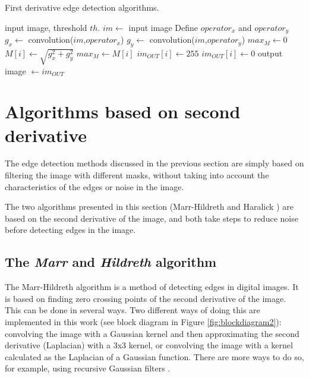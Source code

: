 \documentclass{ipol}
\numberwithin{equation}{section}
\numberwithin{table}{section}
\begin{document}
\begin{algorithm}[t]
\caption{First derivative edge detection algorithms.}
\label{algo:fded}
\begin{algorithmic}[1]
\REQUIRE input image, threshold $th$.
\STATE $im \leftarrow$ input image
\STATE Define $operator_x$ and $operator_y$ 
\STATE $g_x \leftarrow$ convolution($im$,$operator_x$)
\STATE $g_y \leftarrow$ convolution($im$,$operator_y$)
\STATE $max_M \leftarrow 0$
	\STATE $M[i] \leftarrow \sqrt{g_x^2+g_y^2}$ 
		\STATE $max_M \leftarrow M[i]$
	\ENDIF
\ENDFOR
{}
		\STATE $im_{OUT}[i] \leftarrow 255$
	\ELSE
		\STATE $im_{OUT}[i] \leftarrow 0$
	\ENDIF
\ENDFOR
\RETURN output image $\leftarrow im_{OUT}$
\end{algorithmic}
\end{algorithm}


\section{Algorithms based on second derivative}
\label{sec:second}

The edge detection methods discussed in the previous section are simply based on filtering the 
image with different masks, without taking into account the characteristics of the edges or 
noise in the image. 

The two algorithms presented in this section (Marr-Hildreth \cite{AIM-518} and Haralick \cite{bb20239}) 
are based on the second derivative of the image, and both take steps to reduce noise before 
detecting edges in the image.


\subsection{The \textit{Marr} and \textit{Hildreth} algorithm}

The Marr-Hildreth algorithm is a method of detecting edges in digital 
images. It is based on finding zero crossing points of the second derivative
of the image. This can be done in several ways. Two different ways of doing 
this are implemented in this work (see block diagram in Figure 
\ref{fig:blockdiagram2}): convolving the image with a Gaussian kernel and then 
approximating the second derivative (Laplacian) with a 3x3 kernel, or 
convolving the image with a kernel calculated as the Laplacian of a 
Gaussian function. There are more ways to do so, for example, using 
recursive Gaussian filters \cite{Deriche1993Recursively}. 
\end{document}
